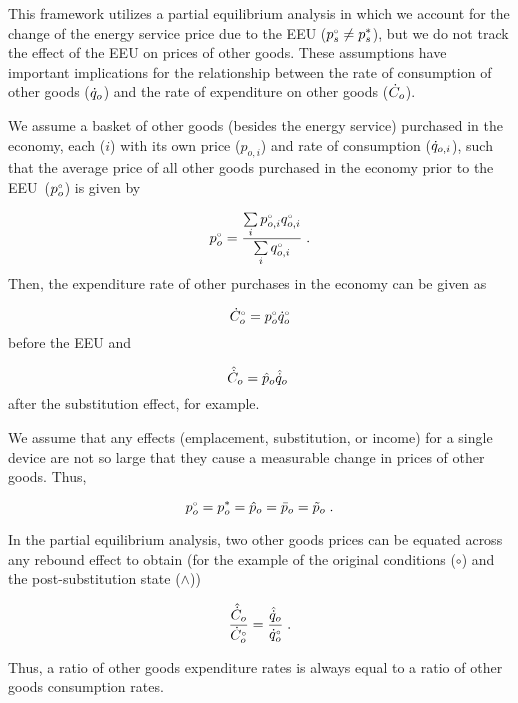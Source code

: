 

This framework utilizes
a partial equilibrium analysis
in which we account for the change of the energy service price
due to the EEU (${}{p}^{\scriptscriptstyle \circ}_s \neq {p}^*_s$), but 
we do not track the effect of the EEU on prices of other goods.
These assumptions have important implications for the relationship between 
the rate of consumption of other goods ($\dot{q}_o$) and 
the rate of expenditure on other goods ($\dot{C}_o$).

We assume a basket of other goods (besides the energy service) 
purchased in the economy,
each ($i$) with its own price ($p_{o,i}$) and rate of consumption ($\dot{q}_{o,i}$),
such that the average price of all other goods purchased in the economy
prior to the EEU~(${}{p}^{\scriptscriptstyle \circ}_o$) is given by

\begin{equation}
  {}{p}^{\scriptscriptstyle \circ}_o = \frac{\sum\limits_i {}{p}^{\scriptscriptstyle \circ}_{o,i} {}{q}^{\scriptscriptstyle \circ}_{o,i}}{\sum\limits_i {}{q}^{\scriptscriptstyle \circ}_{o,i}} \; .
\end{equation}
%
Then, the expenditure rate of other purchases in the economy can be given as

\begin{equation}
  {}{\dot{C}}^{\scriptscriptstyle \circ}_o = {}{p}^{\scriptscriptstyle \circ}_o {}{\dot{q}}^{\scriptscriptstyle \circ}_o
\end{equation}
%
before the EEU and

\begin{equation}
  \hat{\dot{C}}_o = \hat{p}_o \hat{\dot{q}}_o \; 
\end{equation}
%
after the substitution effect, for example.

We assume that any effects (emplacement, substitution, or income)
for a single device 
are not so large that they 
cause a measurable change in prices of other goods. 
Thus, 

\begin{equation}
  {}{p}^{\scriptscriptstyle \circ}_o = {p}^*_o = \hat{p}_o = \bar{p}_o = \tilde{p}_o \; .
\end{equation}

In the partial equilibrium analysis, 
two other goods prices can be equated 
across any rebound effect
to obtain
(for the example of the original conditions ($\circ$) 
and the post-substitution state ($\wedge$))

\begin{equation} \label{eq:qo_Co_equality}
  \frac{\hat{\dot{C}}_o}{{}{\dot{C}}^{\scriptscriptstyle \circ}_o} 
      = \frac{\hat{\dot{q}}_o}{{}{\dot{q}}^{\scriptscriptstyle \circ}_o} \; .
\end{equation}

Thus, a ratio of other goods expenditure rates
is always equal to a ratio of other goods consumption rates.









